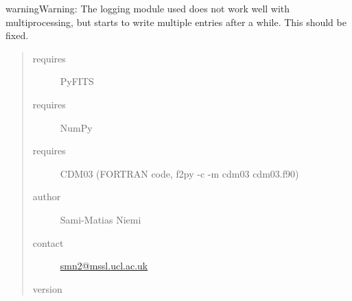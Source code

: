 \documentclass[a4paper,12pt,english]{sphinxmanual}
\begin{document}
\begin{notice}{warning}{Warning:}
The logging module used does not work well with multiprocessing, but
starts to write multiple entries after a while. This should be fixed.
\end{notice}
\begin{quote}\begin{description}
\item[{requires}] \leavevmode
PyFITS

\item[{requires}] \leavevmode
NumPy

\item[{requires}] \leavevmode
CDM03 (FORTRAN code, f2py -c -m cdm03 cdm03.f90)

\item[{author}] \leavevmode
Sami-Matias Niemi

\item[{contact}] \leavevmode
\href{mailto:smn2@mssl.ucl.ac.uk}{smn2@mssl.ucl.ac.uk}

\item[{version}] 

\end{description}\end{quote}
\end{document}
